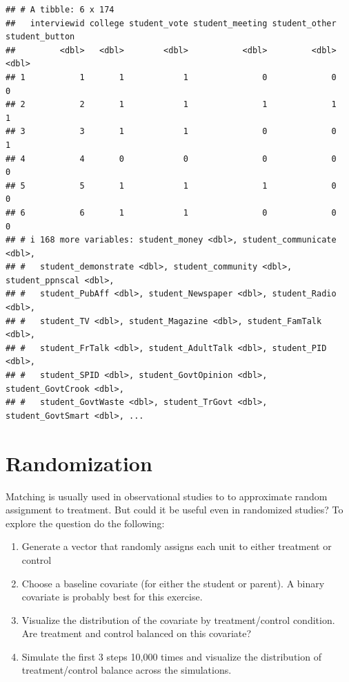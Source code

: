 \documentclass[
]{article}
\begin{document}
\begin{verbatim}
## # A tibble: 6 x 174
##   interviewid college student_vote student_meeting student_other student_button
##         <dbl>   <dbl>        <dbl>           <dbl>         <dbl>          <dbl>
## 1           1       1            1               0             0              0
## 2           2       1            1               1             1              1
## 3           3       1            1               0             0              1
## 4           4       0            0               0             0              0
## 5           5       1            1               1             0              0
## 6           6       1            1               0             0              0
## # i 168 more variables: student_money <dbl>, student_communicate <dbl>,
## #   student_demonstrate <dbl>, student_community <dbl>, student_ppnscal <dbl>,
## #   student_PubAff <dbl>, student_Newspaper <dbl>, student_Radio <dbl>,
## #   student_TV <dbl>, student_Magazine <dbl>, student_FamTalk <dbl>,
## #   student_FrTalk <dbl>, student_AdultTalk <dbl>, student_PID <dbl>,
## #   student_SPID <dbl>, student_GovtOpinion <dbl>, student_GovtCrook <dbl>,
## #   student_GovtWaste <dbl>, student_TrGovt <dbl>, student_GovtSmart <dbl>, ...
\end{verbatim}

\hypertarget{randomization}{%
\section{Randomization}\label{randomization}}

Matching is usually used in observational studies to to approximate
random assignment to treatment. But could it be useful even in
randomized studies? To explore the question do the following:

\begin{enumerate}
    \item Generate a vector that randomly assigns each unit to either treatment or control
    \item Choose a baseline covariate (for either the student or parent). A binary covariate is probably best for this exercise.
    \item Visualize the distribution of the covariate by treatment/control condition. Are treatment and control balanced on this covariate?
    \item Simulate the first 3 steps 10,000 times and visualize the distribution of treatment/control balance across the simulations.
\end{enumerate}
\end{document}
